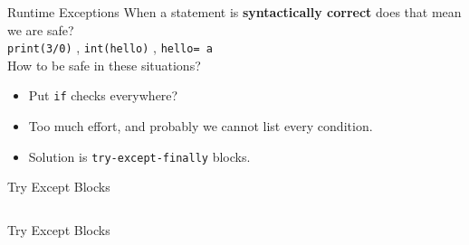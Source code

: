     \begin{frame}{Runtime Exceptions}
        \LARGE
        When a statement is \textbf{syntactically correct} does that mean we are safe?\\
        \pause
        \texttt{print(3/0)}
        \pause
        , \texttt{int(\textquotesingle hello\textquotesingle)}
        \pause
        , \texttt{\textquotesingle hello\textquotesingle [2] = \textquotesingle a\textquotesingle }\\
        \pause
        How to be safe in these situations?
        \begin{itemize}
            \pause
            \item Put \texttt{if} checks everywhere?
            \pause
            \item Too much effort, and probably we cannot list every condition.
            \pause
            \item Solution is \texttt{try-except-finally} blocks.
        \end{itemize}
    \end{frame}

    \begin{frame}{Try Except Blocks}
        \inputminted[frame=single,framesep=2pt]{python3}{./code_examples/try_except_finally.py}
    \end{frame}

    \begin{frame}{Try Except Blocks}
        \LARGE
        \inputminted[frame=single,framesep=2pt,lastline=9]{python3}{./code_examples/try_except.py}
    \end{frame}

